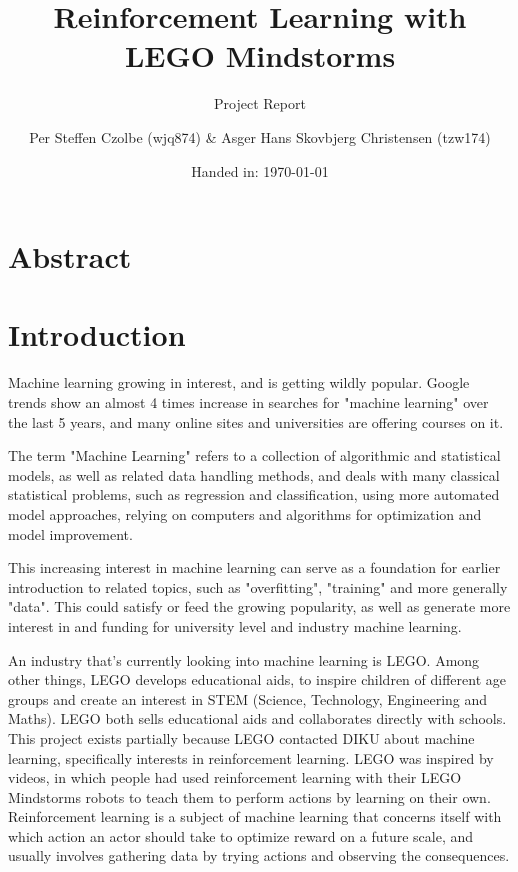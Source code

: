 \documentclass[11pt, a4paper]{article}
\author{Per Steffen Czolbe (wjq874) \& Asger Hans Skovbjerg Christensen (tzw174)}
\title{Reinforcement Learning with LEGO Mindstorms}
\subtitle{Project Report}
\date{Handed in: \today}
\begin{document}
\maketitle

\section{Abstract}

\tableofcontents


\section{Introduction}
Machine learning growing in interest, and is getting wildly popular. Google trends show an almost 4 times increase in searches for "machine learning" over the last 5 years\cite{googletrendsML}, and many online sites and universities are offering courses on it.

The term "Machine Learning" refers to a collection of algorithmic and statistical models, as well as related data handling methods, and deals with many classical statistical problems, such as regression and classification, using more automated model approaches, relying on computers and algorithms for optimization and model improvement.

This increasing interest in machine learning can serve as a foundation for earlier introduction to related topics, such as "overfitting", "training" and more generally "data". This could satisfy or feed the growing popularity, as well as generate more interest in and funding for university level and industry machine learning. 

An industry that's currently looking into machine learning is LEGO. Among other things, LEGO develops educational aids, to inspire children of different age groups and create an interest in STEM (Science, Technology, Engineering and Maths)\cite{LEGOeducation}. LEGO both sells educational aids and collaborates directly with schools\cite{naerheden}. This project exists partially because LEGO contacted DIKU about machine learning, specifically interests in reinforcement learning. LEGO was inspired by videos, in which people had used reinforcement learning with their LEGO Mindstorms robots to teach them to perform actions by learning on their own\cite{youtube_crawl}\cite{youtube_swing}. Reinforcement learning is a subject of machine learning that concerns itself with which action an actor should take to optimize reward on a future scale, and usually involves gathering data by trying actions and observing the consequences. 
\end{document}
